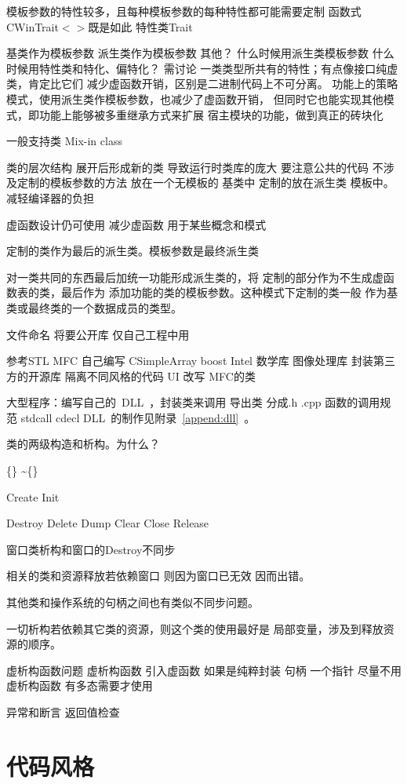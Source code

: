 模板参数的特性较多，且每种模板参数的每种特性都可能需要定制
函数式 CWinTrait$<>$既是如此
特性类Trait

基类作为模板参数
派生类作为模板参数
其他？
什么时候用派生类模板参数 什么时候用特性类和特化、偏特化？
需讨论 一类类型所共有的特性；有点像接口纯虚类，肯定比它们
减少虚函数开销，区别是二进制代码上不可分离。
功能上的策略模式，使用派生类作模板参数，也减少了虚函数开销，
但同时它也能实现其他模式，即功能上能够被多重继承方式来扩展
宿主模块的功能，做到真正的砖块化

一般支持类 Mix-in class

类的层次结构 展开后形成新的类 导致运行时类库的庞大
要注意公共的代码
不涉及定制的模板参数的方法 放在一个无模板的
基类中 定制的放在派生类 模板中。减轻编译器的负担

虚函数设计仍可使用 减少虚函数 用于某些概念和模式


定制的类作为最后的派生类。模板参数是最终派生类

对一类共同的东西最后加统一功能形成派生类的，将
定制的部分作为不生成虚函数表的类，最后作为
添加功能的类的模板参数。这种模式下定制的类一般
作为基类或最终类的一个数据成员的类型。

文件命名 将要公开库 仅自己工程中用

参考STL MFC 自己编写 CSimpleArray boost Intel 数学库 图像处理库
封装第三方的开源库 隔离不同风格的代码
UI 改写 MFC的类

大型程序：编写自己的~DLL~，封装类来调用
导出类 分成.h .cpp
函数的调用规范 stdcall cdecl
DLL~的制作见附录~\ref{append:dll}~。

类的两级构造和析构。为什么？

\{\} \~{}\{\}

Create Init

Destroy Delete Dump Clear Close Release

窗口类析构和窗口的Destroy不同步


相关的类和资源释放若依赖窗口 则因为窗口已无效
因而出错。

其他类和操作系统的句柄之间也有类似不同步问题。

一切析构若依赖其它类的资源，则这个类的使用最好是
局部变量，涉及到释放资源的顺序。

虚析构函数问题
虚析构函数 引入虚函数 如果是纯粹封装 句柄 一个指针
尽量不用虚析构函数 有多态需要才使用

异常和断言 返回值检查

\section{代码风格}

